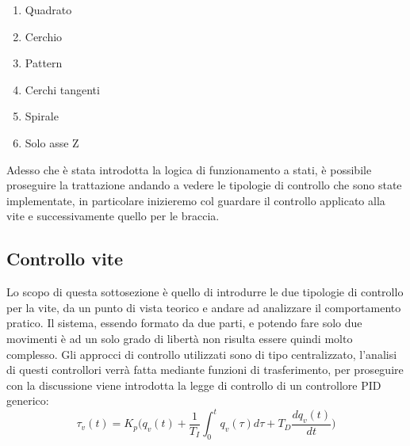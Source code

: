 \begin{enumerate}
	\item Quadrato
	\item Cerchio
	\item Pattern
	\item Cerchi tangenti
	\item Spirale
	\item Solo asse Z
\end{enumerate}
Adesso che è stata introdotta la logica di funzionamento a stati, è possibile proseguire la trattazione andando a vedere le tipologie di controllo che sono state implementate, in particolare inizieremo col guardare il controllo applicato alla vite e successivamente quello per le braccia.
\subsection{Controllo vite}%
Lo scopo di questa sottosezione è quello di introdurre le due tipologie di controllo per la vite, da un punto di vista teorico e andare ad analizzare il comportamento pratico. Il sistema, essendo formato da due parti, e potendo fare solo due movimenti è ad un solo grado di libertà non risulta essere quindi molto complesso. Gli approcci di controllo utilizzati sono di tipo centralizzato, l'analisi di questi controllori verrà fatta mediante funzioni di trasferimento, per proseguire con la discussione viene introdotta la legge di controllo di un controllore PID generico:
\begin{equation}
\tau_v (t) = K_p \bigg(q_v(t) + \frac{1}{T_I} \int_0^t q_v(\tau) d\tau + T_D \frac{d q_v(t)}{dt}\bigg)
\label{eq:PID}
\end{equation}
